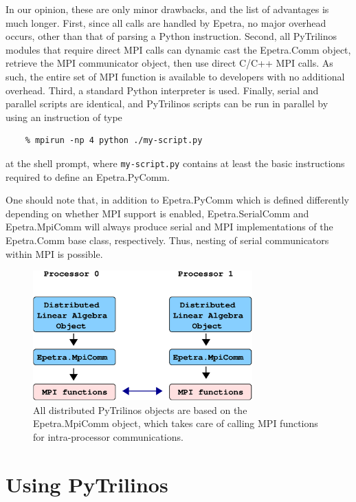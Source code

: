 \documentclass[10pt,relax]{SANDreport}
\begin{document}
In our opinion, these are only minor drawbacks, and the list of
advantages is much longer. First, since all calls are handled by
Epetra, no major overhead occurs, other than that of parsing a
Python instruction. Second, all PyTrilinos modules that require
direct MPI calls can dynamic cast the Epetra.Comm object, retrieve
the MPI communicator object, then use direct C/C++ MPI calls. As
such, the entire set of MPI function is available to developers with
no additional overhead. Third, a standard Python interpreter is
used. Finally, serial and parallel scripts are identical, and
 PyTrilinos scripts can be run in parallel
by using an instruction of type
\begin{verbatim}
    % mpirun -np 4 python ./my-script.py
\end{verbatim}
at the shell prompt, where {\tt my-script.py} contains at least the basic
instructions required to define an Epetra.PyComm.

One should note that, in addition to Epetra.PyComm which is defined
differently depending on whether MPI support is enabled,
Epetra.SerialComm and Epetra.MpiComm will always produce serial and
MPI implementations of the Epetra.Comm base class, respectively.
Thus, nesting of serial communicators within MPI is possible.

\begin{figure}
\begin{center}
\includegraphics[height=5cm]{../UsersGuide/distributed_object.eps}
\caption{All distributed PyTrilinos objects are based on the Epetra.MpiComm
  object, which takes care of calling MPI functions for intra-processor
    communications.}
\label{fig:distributed}
\end{center}
\end{figure}


\section{Using PyTrilinos}
\label{sec:using}
\end{document}
